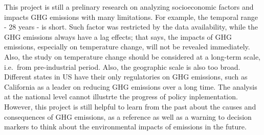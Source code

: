 \documentclass[12pt,]{article}
\begin{document}
This project is still a prelinary research on analyzing socioeconomic
factors and impacts GHG emissions with many limitations. For example,
the temporal range - 28 years - is short. Such factor was restricted by
the data availability, while the GHG emissions always have a lag
effects; that says, the impacts of GHG emissions, especially on
temperature change, will not be revealed immediately. Also, the study on
temperature change should be considered at a long-term scale, i.e.~from
pre-industrial period. Also, the geographic scale is also too broad.
Different states in US have their only regulatories on GHG emissions,
such as California as a leader on reducing GHG emissions over a long
time. The analysis at the national level cannot illustrte the progress
of policy inplementation. However, this project is still helpful to
learn from the past about the causes and consequences of GHG emissions,
as a reference as well as a warning to decision markers to think about
the environmental impacts of emissions in the future.
\end{document}
